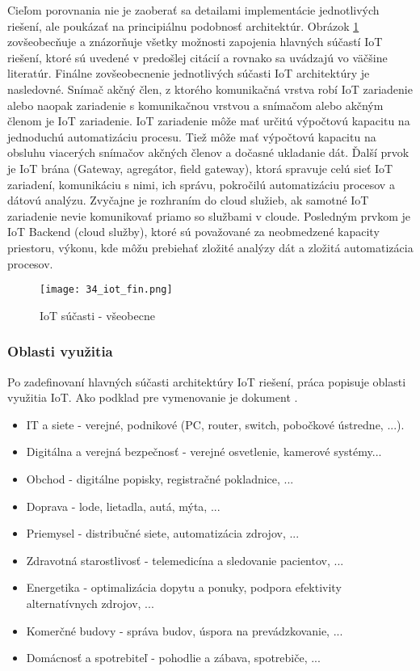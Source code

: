 Cieľom porovnania nie je zaoberať sa detailami implementácie jednotlivých riešení, ale poukázať na principiálnu podobnosť architektúr. Obrázok \ref{34_iot_fin} zovšeobecňuje a znázorňuje všetky možnosti zapojenia hlavných súčastí IoT riešení, ktoré sú uvedené v predošlej citácií a rovnako sa uvádzajú vo väčšine literatúr. Finálne zovšeobecnenie jednotlivých súčasti IoT architektúry je nasledovné. Snímač akčný člen, z ktorého komunikačná vrstva robí IoT zariadenie alebo naopak zariadenie s komunikačnou vrstvou a snímačom alebo akčným členom je IoT zariadenie. IoT zariadenie môže mať určitú výpočtovú kapacitu na jednoduchú automatizáciu procesu. Tiež môže mať výpočtovú kapacitu na obsluhu viacerých snímačov akčných členov a dočasné ukladanie dát. Ďalší prvok je IoT brána (Gateway, agregátor, field gateway), ktorá spravuje celú sieť IoT zariadení, komunikáciu s nimi, ich správu, pokročilú automatizáciu procesov a dátovú analýzu. Zvyčajne je rozhraním do cloud služieb, ak samotné IoT zariadenie nevie komunikovať priamo so službami v cloude. Posledným prvkom je IoT Backend (cloud služby), ktoré sú považované za neobmedzené kapacity priestoru, výkonu, kde môžu prebiehať zložité analýzy dát a zložitá automatizácia procesov.
\begin{figure}[h]
\centering
\texttt{[image: 34\_iot\_fin.png]}
\caption{IoT súčasti - všeobecne\cite{IOT23}}
\label{34_iot_fin}
\end{figure} 
\subsubsection{Oblasti využitia}
Po zadefinovaní hlavných súčasti architektúry IoT riešení, práca popisuje oblasti využitia IoT. Ako podklad pre vymenovanie je dokument \cite{IOT24}.
\begin{itemize}
\item IT a siete - verejné, podnikové (PC, router, switch, pobočkové ústredne, ...).
\item Digitálna a verejná bezpečnosť - verejné osvetlenie, kamerové systémy...
\item Obchod - digitálne popisky, registračné pokladnice, ... 
\item Doprava - lode, lietadla, autá, mýta, ...
\item Priemysel - distribučné siete, automatizácia zdrojov, ...
\item Zdravotná starostlivosť - telemedicína a sledovanie pacientov, ...
\item Energetika - optimalizácia dopytu a ponuky, podpora efektivity alternatívnych zdrojov, ...
\item Komerčné budovy - správa budov, úspora na prevádzkovanie, ...
\item Domácnosť a spotrebiteľ - pohodlie a zábava, spotrebiče, ...
\end{itemize}

